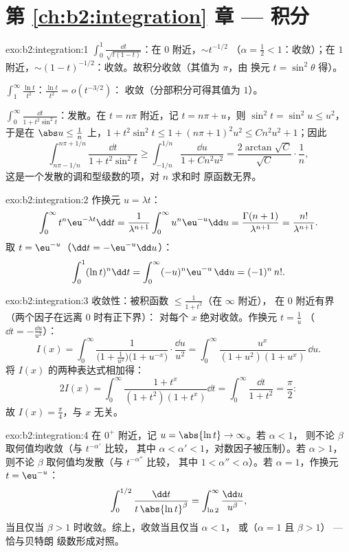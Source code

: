 \section*{第 \ref{ch:b2:integration} 章 --- 积分}

\begin{solution}{exo:b2:integration:1}
$\int_0^1 \frac{\dd t}{\sqrt{t(1-t)}}$：在 $0$ 附近，$\sim t^{-1/2}$
（$\alpha = \frac12 < 1$：收敛）；在 $1$ 附近，$\sim
(1-t)^{-1/2}$：收敛。故积分收敛（其值为 $\pi$，由
换元 $t = \sin^2\theta$ 得）。

$\int_1^\infty \frac{\ln t}{t^2}$：$\frac{\ln t}{t^2} = o(t^{-3/2})$：
收敛（分部积分可得其值为 $1$）。

$\int_0^\infty \frac{\dd t}{1 + t^2\sin^2 t}$：发散。在 $t =
n\pi$ 附近，记 $t = n\pi + u$，则 $\sin^2 t = \sin^2 u \leq u^2$，于是在
$\abs u \leq \frac{1}{n}$ 上，$1 + t^2\sin^2 t \leq 1 + (n\pi +
1)^2u^2 \leq C n^2 u^2 + 1$；因此
\[
\int_{n\pi - 1/n}^{n\pi + 1/n} \frac{\dd t}{1 + t^2\sin^2 t}
\geq \int_{-1/n}^{1/n} \frac{\dd u}{1 + Cn^2u^2}
= \frac{2\arctan\sqrt C}{\sqrt C}\cdot\frac{1}{n} ,
\]
这是一个发散的调和型级数的项，对 $n$ 求和时
原函数无界。
\end{solution}

\begin{solution}{exo:b2:integration:2}
作换元 $u = \lambda t$：
\[
\int_0^\infty t^n \eu^{-\lambda t}\dd t
= \frac{1}{\lambda^{n+1}}\int_0^\infty u^n\eu^{-u}\dd u
= \frac{\Gamma(n+1)}{\lambda^{n+1}} = \frac{n!}{\lambda^{n+1}} .
\]
取 $t = \eu^{-u}$（$\dd t = -\eu^{-u}\dd u$）：
\[
\int_0^1 (\ln t)^n \dd t = \int_0^{\infty} (-u)^n \eu^{-u}\,\dd u
= (-1)^n\, n! .
\]
\end{solution}

\begin{solution}{exo:b2:integration:3}
收敛性：被积函数 $\leq \frac{1}{1+t^2}$（在 $\infty$ 附近），
在 $0$ 附近有界（两个因子在远离 $0$ 时有正下界）：
对每个 $x$ 绝对收敛。作换元 $t = \frac1u$
（$\dd t = -\frac{\dd u}{u^2}$）：
\[
I(x) = \int_0^\infty \frac{1}{\bigl(1 +
\frac1{u^2}\bigr)\bigl(1 + u^{-x}\bigr)}\cdot\frac{\dd u}{u^2}
= \int_0^\infty \frac{u^x}{(1 + u^2)(1 + u^x)}\,\dd u .
\]
将 $I(x)$ 的两种表达式相加得：
\[
2I(x) = \int_0^\infty \frac{1 + t^x}{(1+t^2)(1+t^x)}\dd t
= \int_0^\infty \frac{\dd t}{1 + t^2} = \frac{\pi}{2} :
\]
故 $I(x) = \frac\pi4$，与 $x$ 无关。
\end{solution}

\begin{solution}{exo:b2:integration:4}
在 $0^+$ 附近，记 $u = \abs{\ln t} \to \infty$。若 $\alpha < 1$，
则不论 $\beta$ 取何值均收敛（与 $t^{-\alpha'}$ 比较，
其中 $\alpha < \alpha' < 1$，对数因子被压制）。若 $\alpha > 1$，
则不论 $\beta$ 取何值均发散（与 $t^{-\alpha''}$ 比较，
其中 $1 < \alpha'' < \alpha$）。若 $\alpha = 1$，作换元 $t =
\eu^{-u}$：
\[
\int_0^{1/2} \frac{\dd t}{t\,\abs{\ln t}^\beta}
= \int_{\ln 2}^{\infty} \frac{\dd u}{u^\beta},
\]
当且仅当 $\beta > 1$ 时收敛。综上，收敛当且仅当 $\alpha < 1$，
或（$\alpha = 1$ 且 $\beta > 1$） --- 恰与贝特朗
级数形成对照。
\end{solution}

